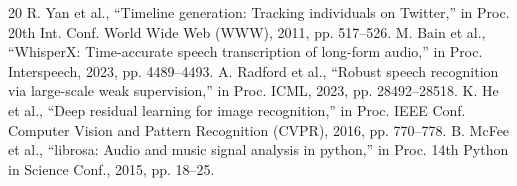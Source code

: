 \begin{thebibliography}{20}
 R. Yan et al., ``Timeline generation: Tracking individuals on Twitter,'' in Proc. 20th Int. Conf. World Wide Web (WWW), 2011, pp. 517–526.
 M. Bain et al., ``WhisperX: Time-accurate speech transcription of long-form audio,'' in Proc. Interspeech, 2023, pp. 4489–4493.
 A. Radford et al., ``Robust speech recognition via large-scale weak supervision,'' in Proc. ICML, 2023, pp. 28492–28518.
 K. He et al., ``Deep residual learning for image recognition,'' in Proc. IEEE Conf. Computer Vision and Pattern Recognition (CVPR), 2016, pp. 770–778.
 B. McFee et al., ``librosa: Audio and music signal analysis in python,'' in Proc. 14th Python in Science Conf., 2015, pp. 18–25.
\end{thebibliography}
